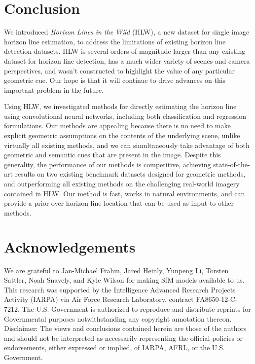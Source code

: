 \documentclass{bmvc2k}
\begin{document}
\section{Conclusion}

We introduced {\em Horizon Lines in the Wild} (HLW), a new dataset for
single image horizon line estimation, to address the limitations of
existing horizon line detection datasets. HLW is several orders of
magnitude larger than any existing dataset for horizon line detection,
has a much wider variety of scenes and camera perspectives, and wasn't
constructed to highlight the value of any particular geometric cue.
Our hope is that it will continue to drive advances on this important
problem in the future. 

Using HLW, we investigated
methods for directly estimating the horizon line using convolutional
neural networks, including both classification and regression
formulations. Our methods are appealing because there is no need to
make explicit geometric assumptions on the contents of the
underlying scene, unlike virtually all existing methods, and we can
simultaneously take advantage of both geometric and semantic cues that
are present in the image. Despite this generality, the performance of
our methods is competitive, achieving state-of-the-art results on two
existing benchmark datasets designed for geometric methods, and
outperforming all existing methods on the challenging real-world
imagery contained in HLW. Our method is fast, works in natural
environments, and can provide a prior over horizon line location that
can be used as input to other methods.

\section*{Acknowledgements} 
We are grateful to Jan-Michael Frahm, Jared Heinly, Yunpeng Li,
Torsten Sattler, Noah Snavely, and Kyle Wilson for making SfM models
available to us.
This research was supported by the Intelligence Advanced
Research Projects Activity (IARPA) via Air Force Research Laboratory,
contract FA8650-12-C-7212.  The U.S. Government is authorized to
reproduce and distribute reprints for Governmental purposes
notwithstanding any copyright annotation thereon. Disclaimer: The
views and conclusions contained herein are those of the authors and
should not be interpreted as necessarily representing the official
policies or endorsements, either expressed or implied, of IARPA, AFRL,
or the U.S. Government.


\end{document}

